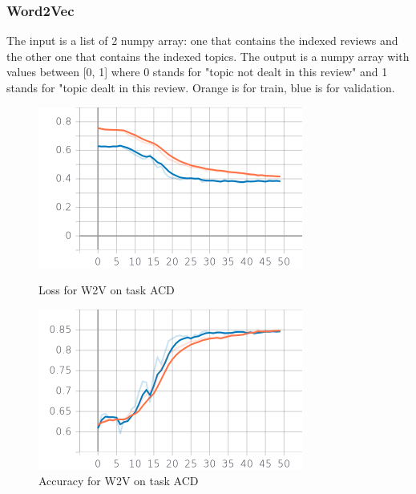 \documentclass{article}
\begin{document}
            \subsubsection{Word2Vec}
                The input is a list of 2 numpy array: one that contains the indexed reviews and the other one that contains the indexed topics.
                The output is a numpy array with values between [0, 1] where 0 stands for "topic not dealt in this review" and 1 stands for "topic dealt in this review.
                \color{orange} Orange is for train, \color{blue} blue is for validation.\color{black}
                \begin{figure}[!htb]
                \begin{minipage}{0.48\textwidth}
                    \centering
                    \includegraphics[width=.7\linewidth]{w2v_acd_epoch_loss.png}
                    \caption{Loss for W2V on task ACD}\label{Fig:Data7}
                \end{minipage}\hfill
                \begin{minipage}{0.48\textwidth}
                    \centering
                    \includegraphics[width=.7\linewidth]{w2v_acd_epoch_accuracy.png}
                    \caption{Accuracy for W2V on task ACD}\label{Fig:Data8}
                \end{minipage}
                \begin{minipage}{0.48\textwidth}

\end{minipage}
\end{figure}
\end{document}
